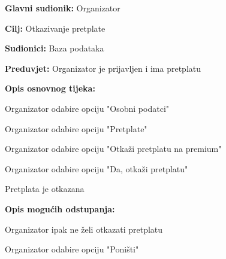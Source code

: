 					\noindent {}
					\begin{packed_item}
	
						\item \textbf{Glavni sudionik:} Organizator
						\item  \textbf{Cilj:} Otkazivanje pretplate
						\item  \textbf{Sudionici:} Baza podataka
						\item  \textbf{Preduvjet:} Organizator je prijavljen i ima pretplatu
						\item  \textbf{Opis osnovnog tijeka:}
						
						\item[] \begin{packed_enum}
	
							\item Organizator odabire opciju "Osobni podatci"
							\item Organizator odabire opciju "Pretplate"
							\item Organizator odabire opciju "Otkaži pretplatu na premium"
							\item Organizator odabire opciju "Da, otkaži pretplatu"
							\item Pretplata je otkazana
						\end{packed_enum}
						
						\item  \textbf{Opis mogućih odstupanja:}
						
						\item[] \begin{packed_item}
	
							\item[4.a] Organizator ipak ne želi otkazati pretplatu
							\item[] \begin{packed_enum}
								
								\item Organizator odabire opciju "Poništi"
								
							\end{packed_enum}
						\end{packed_item}
					\end{packed_item}
					
